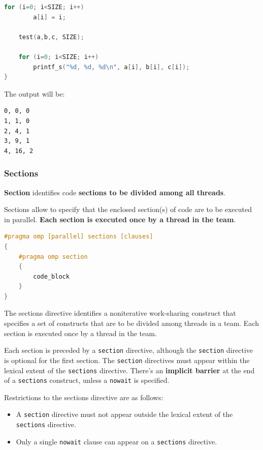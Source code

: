 \begin{itemize}
\begin{examplebox}
\begin{lstlisting}[language=C++]
    for (i=0; i<SIZE; i++)
        a[i] = i;

    test(a,b,c, SIZE);

    for (i=0; i<SIZE; i++)
        printf_s("%d, %d, %d\n", a[i], b[i], c[i]);
}\end{lstlisting}
    The output will be:
\begin{lstlisting}
0, 0, 0
1, 1, 0
2, 4, 1
3, 9, 1
4, 16, 2\end{lstlisting}
    \end{examplebox}
\end{itemize}

\newpage

\subsubsection{Sections}

\textbf{Section} identifies code \textbf{sections to be divided among all threads}.

\highspace
Sections allow to specify that the enclosed section(s) of code are to be executed in parallel. \textbf{Each section is executed once by a thread in the team}.

\begin{openmpbox}[: sections]
\begin{lstlisting}[language=C++]
#pragma omp [parallel] sections [clauses]
{
    #pragma omp section
    {
        code_block
    }
}\end{lstlisting}
\end{openmpbox}

\noindent
The sections directive identifies a noniterative work-sharing construct that specifies a set of constructs that are to be divided among threads in a team. Each section is executed once by a thread in the team.

\highspace
Each section is preceded by a \texttt{section} directive, although the \texttt{section} directive is optional for the first section. The \texttt{section} directives must appear within the lexical extent of the \texttt{sections} directive. There's an \textbf{implicit barrier} at the end of a \texttt{sections} construct, unless a \texttt{nowait} is specified.

\highspace
Restrictions to the sections directive are as follows:
\begin{itemize}
    \item A \texttt{section} directive must not appear outside the lexical extent of the \texttt{sections} directive.
    \item Only a single \texttt{nowait} clause can appear on a \texttt{sections} directive.
\end{itemize}

